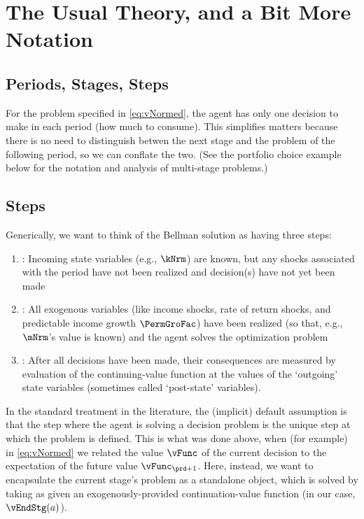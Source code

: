 \documentclass[\econtexRoot/SolvingMicroDSOPs]{subfiles}
\begin{document}
\hypertarget{the-usual-theory}{}
\section{The Usual Theory, and a Bit More Notation}\label{sec:the-usual-theory}


\subsection{Periods, Stages, Steps}

For the problem specified in \eqref{eq:vNormed}, the agent has only one decision to make in each {period} (how much to consume). %
This simplifies matters because there is no need to distinguish betwen the next {stage} and the problem of the following {period}, so we can conflate the two.  (See the portfolio choice example below for the notation and analysis of multi-{stage} problems.)

\subsection{Steps}

Generically, we want to think of the Bellman solution as having three {steps}:
\begin{enumerate}
\item \textbf{\Arrival}: Incoming state variables (e.g., $\kNrm$) are known, but any shocks associated with the period have not been realized and decision(s) have not yet been made
\item \textbf{\Decision}: All exogenous variables (like income shocks, rate of return shocks, and predictable income growth $\PermGroFac$) have been realized (so that, e.g., $\mNrm$'s value is known) and the agent solves the optimization problem
\item \textbf{\Continuation}: After all decisions have been made, their consequences are measured by evaluation of the continuing-value function at the values of the `outgoing' state variables (sometimes called `post-state' variables).
\end{enumerate}

In the standard treatment in the literature, the (implicit) default assumption is that the {step} where the agent is solving a decision problem is the unique {step} at which the problem is defined.  This is what was done above, when (for example) in \eqref{eq:vNormed} we related the value $\vFunc$ of the current decision to the expectation of the future value $\vFunc_{\prd+1}$.  Here, instead, we want to encapsulate the current {stage}'s problem as a standalone object, which is solved by taking as given an exogenously-provided continuation-value function (in our case, $\vEndStg(a)$).
\end{document}
